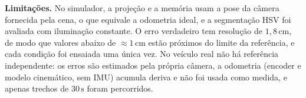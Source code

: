 \textbf{Limitações.} No simulador, a projeção e a memória usam a pose da câmera fornecida pela cena, o que equivale a odometria ideal, e a segmentação HSV foi avaliada com iluminação constante. O erro verdadeiro tem resolução de $1{,}8\,\mathrm{cm}$, de modo que valores abaixo de $\approx1\,\mathrm{cm}$ estão próximos do limite da referência, e cada condição foi ensaiada uma única vez. No veículo real não há referência independente: os erros são estimados pela própria câmera, a odometria (encoder e modelo cinemático, sem IMU) acumula deriva e não foi usada como medida, e apenas trechos de $30\,\mathrm{s}$ foram percorridos.
